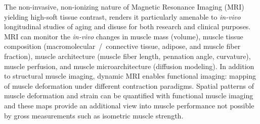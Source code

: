 The non-invasive, non-ionizing nature of Magnetic Resonance Imaging (MRI) yielding high-soft tissue contrast, renders it particularly amenable to \textit{in-vivo} longitudinal studies of aging and disuse for both research and clinical purposes. 
MRI can monitor the \textit{in-vivo} changes in muscle mass (volume), muscle tissue composition (macromolecular~/~connective tissue, adipose, and muscle fiber fraction), muscle architecture (muscle fiber length, pennation angle, curvature), muscle perfusion, and muscle microarchitecture (diffusion modeling). 
In addition to structural muscle imaging, dynamic MRI enables functional imaging: mapping of muscle deformation under different contraction paradigms. 
Spatial patterns of muscle deformation and strain can be quantified with functional muscle imaging and these maps provide an additional view into muscle performance not possible by gross measurements such as isometric muscle strength. 

